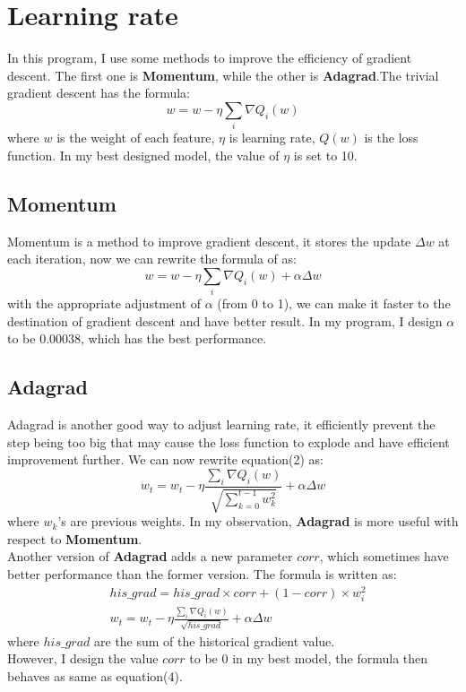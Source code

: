\documentclass[11pt]{article}
\newcommand\n{\mbox{\qquad}}
\begin{document}
\section{Learning rate}
\n In this program, I use some methods to improve the efficiency of gradient descent. The first one is \textbf{Momentum}, while the other is \textbf{Adagrad}.The trivial gradient descent has the formula:
	\begin{equation}
		w = w - \eta \sum_i \nabla Q_i(w)
	\end{equation}
where $w$ is the weight of each feature, $\eta$ is learning rate, $Q(w)$ is the loss function. In my best designed model, the value of $\eta$ is set to 10.
\subsection{Momentum}
\n Momentum is a method to improve gradient descent, it stores the update $\Delta w$ at each iteration, now we can rewrite the formula of as:
	\begin{equation}
		w = w - \eta \sum_i \nabla Q_i(w) + \alpha \Delta w
	\end{equation}
with the appropriate adjustment of $\alpha$ (from 0 to 1), we can make it faster to the destination of gradient descent and have better result. In my program, I design $\alpha$ to be 0.00038, which has the best performance. 
\subsection{Adagrad}
\n Adagrad is another good way to adjust learning rate, it efficiently prevent the step being too big that may cause the loss function to explode and have efficient improvement further. We can now rewrite equation(2) as:
	\begin{equation}
		w_t = w_t - \eta \frac{\sum_i \nabla Q_i(w)}{\sqrt{\sum_{k=0}^{t-1} w_k^2}} + \alpha \Delta w
	\end{equation}
where $w_k$'s are previous weights. In my observation, \textbf{Adagrad} is more useful with respect to \textbf{Momentum}. \\
\n Another version of \textbf{Adagrad} adds a new parameter $corr$, which sometimes have better performance than the former version. The formula is written as:
\begin{align*}
	&his\_grad = his\_grad \times corr + (1-corr) \times w_i^2 \\
 	&w_t = w_t - \eta \frac{\sum_i \nabla Q_i(w)}{\sqrt{his\_grad}} + \alpha \Delta w
\end{align*}
where $his\_grad$ are the sum of the historical gradient value.\\
\n However, I design the value $corr$ to be 0 in my best model, the formula then behaves as same as equation(4).
\end{document}
